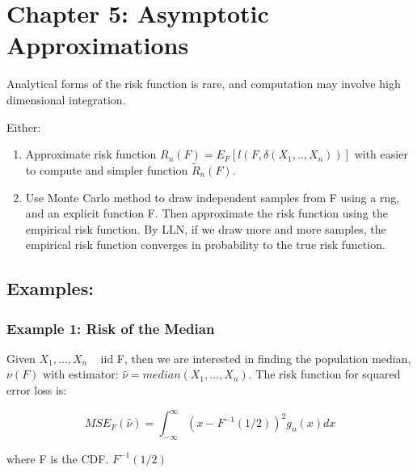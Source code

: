 \section{Chapter 5: Asymptotic Approximations}
  \label{sec:chapterfive}
  	Analytical forms of the risk function is rare, and computation may involve high dimensional integration.

  	Either: 

  	\begin{enumerate}
  		\item Approximate risk function $R_n(F) = E_F [ l(F, \delta(X_1, .., X_n)) ]$ with easier to compute and simpler function $\tilde{R}_n(F)$.
  		\item Use Monte Carlo method to draw independent samples from F using a rng, and an explicit function F. Then approximate the risk function using the empirical risk function. By LLN, if we draw more and more samples, the empirical risk function converges in probability to the true risk function.
  	\end{enumerate}

  	\subsection{Examples:}

  		\subsubsection{Example 1: Risk of the Median}
	  		Given $X_1, ..., X_n$ ~ iid F, then we are interested in finding the population median, $\nu(F)$ with estimator: $\hat{\nu} = median(X_1, ..., X_n)$. The risk function for squared error loss is:

	  		$$MSE_F(\hat{\nu}) = \int_{-\infty}^{\infty} ( x - F^{-1}(1/2))^2 g_n(x) dx$$

	  		where F is the CDF. $F^{-1}(1/2)$
   	
